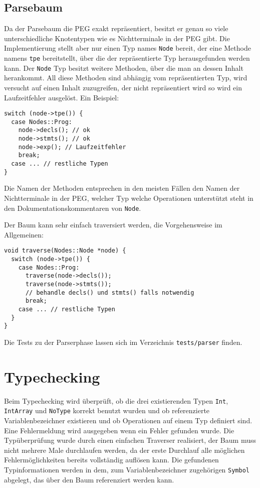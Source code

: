 \documentclass[a4paper,11pt,titlepage,openany,oneside]{scrbook}
\begin{document}
\section{Parsebaum}
Da der Parsebaum die PEG exakt repräsentiert, besitzt er genau so viele unterschiedliche Knotentypen wie es Nichtterminale in der PEG gibt. Die Implementierung stellt aber nur einen Typ names \texttt{Node} bereit, der eine Methode namens \texttt{tpe} bereitstellt, über die der repräsentierte Typ herausgefunden werden kann. Der \texttt{Node} Typ besitzt weitere Methoden, über die man an dessen Inhalt herankommt. All diese Methoden sind abhängig vom repräsentierten Typ, wird versucht auf einen Inhalt zuzugreifen, der nicht repräsentiert wird so wird ein Laufzeitfehler ausgelöst. Ein Beispiel:

\begin{verbatim}
switch (node->tpe()) {
  case Nodes::Prog:
    node->decls(); // ok
    node->stmts(); // ok
    node->exp(); // Laufzeitfehler
    break;
  case ... // restliche Typen
}
\end{verbatim}

Die Namen der Methoden entsprechen in den meisten Fällen den Namen der Nichtterminale in der PEG, welcher Typ welche Operationen unterstützt steht in den Dokumentationskommentaren von \texttt{Node}.

Der Baum kann sehr einfach traversiert werden, die Vorgehensweise im Allgemeinen:

\begin{verbatim}
void traverse(Nodes::Node *node) {
  switch (node->tpe()) {
    case Nodes::Prog:
      traverse(node->decls());
      traverse(node->stmts());
      // behandle decls() und stmts() falls notwendig
      break;
    case ... // restliche Typen
  }
}
\end{verbatim}

Die Tests zu der Parserphase lassen sich im Verzeichnis \texttt{tests/parser} finden.

\chapter{Typechecking}

Beim Typechecking wird überprüft, ob die drei existierenden Typen \texttt{Int}, \texttt{IntArray} und \texttt{NoType} korrekt benutzt wurden und ob referenzierte Variablenbezeichner existieren und ob Operationen auf einem Typ definiert sind. Eine Fehlermeldung wird ausgegeben wenn ein Fehler gefunden wurde. Die Typüberprüfung wurde durch einen einfachen Traverser realisiert, der Baum muss nicht mehrere Male durchlaufen werden, da der erste Durchlauf alle möglichen Fehlermöglichkeiten bereits vollständig auflösen kann. Die gefundenen Typinformationen werden in dem, zum Variablenbezeichner zugehörigen \texttt{Symbol} abgelegt, das über den Baum referenziert werden kann.
\end{document}
